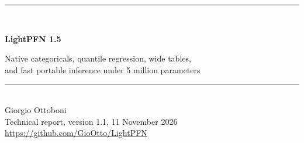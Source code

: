\documentclass[11pt]{article}
\begin{document}
\thispagestyle{plain}
\begin{center}
\rule{\linewidth}{1.6pt}\\[8pt]
{\LARGE\bfseries LightPFN 1.5\par}
\vspace{5pt}
{\Large Native categoricals, quantile regression, wide tables,\\and fast portable inference under 5 million parameters\par}
\vspace{6pt}
\rule{\linewidth}{0.6pt}\\[10pt]
{\large Giorgio Ottoboni}\\[3pt]
{\small Technical report, version 1.1, 11 November 2026}\\[2pt]
{\small\url{https://github.com/GioOtto/LightPFN}}
\end{center}
\vspace{4pt}
\end{document}
